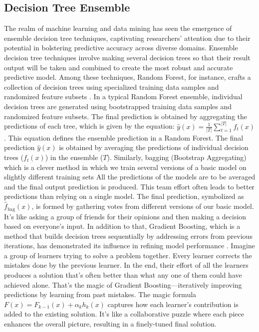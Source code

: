 \documentclass[8pt,a4paper,oneside]{elsarticle}
\begin{document}
\subsection{Decision Tree Ensemble} 

The realm of machine learning and data mining has seen the emergence of ensemble decision tree techniques, captivating researchers' attention due to their potential in bolstering predictive accuracy across diverse domains. Ensemble decision tree techniques involve making several decision trees so that their result output will be taken and combined to create the most robust and accurate predictive model. Among these techniques, Random Forest, for instance, crafts a collection of decision trees using specialized training data samples and randomized feature subsets \cite{breiman2001random_29}.
In a typical Random Forest ensemble, individual decision trees are generated using bootstrapped training data samples and randomized feature subsets. The final prediction is obtained by aggregating the predictions of each tree, which is given by the equation:\newline
\(\hat{y}(x) = \frac{1}{|T|} \sum_{t=1}^{|T|} f_t(x)\).
This equation defines the ensemble prediction in a Random Forest. The final prediction \(\hat{y}(x)\) is obtained by averaging the predictions of individual decision trees (\(f_t(x)\)) in the ensemble (\(T\)).\newline
Similarly, bagging (Bootstrap Aggregating) which is a clever method in which we train several versions of a basic model on slightly different training sets All the predictions of the models are to be averaged and the final output prediction is produced. This team effort often leads to better predictions than relying on a single model.\newline
The final prediction, symbolized as \(\hat{f}_{\text{bag}}(x)\), is formed by gathering votes from different versions of our basic model. It's like asking a group of friends for their opinions and then making a decision based on everyone's input.\newline
In addition to that, Gradient Boosting, which is a method that builds decision trees sequentially by addressing errors from previous iterations, has demonstrated its influence in refining model performance \cite{friedman2001greedy_30}. Imagine a group of learners trying to solve a problem together. Every learner corrects the mistakes done by the previous learner. In the end, their effort of all the learners produces a solution that's often better than what any one of them could have achieved alone. That's the magic of Gradient Boosting—iteratively improving predictions by learning from past mistakes.\newline
The magic formula \(F(x) = F_{k-1}(x) + \alpha_k h_k(x)\) captures how each learner's contribution is added to the existing solution. It's like a collaborative puzzle where each piece enhances the overall picture, resulting in a finely-tuned final solution. 
\end{document}
